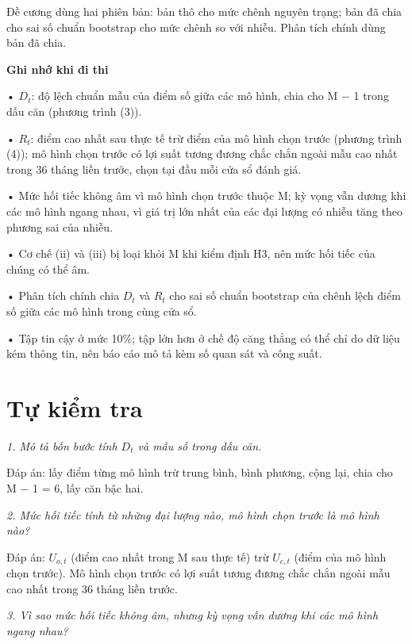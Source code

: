 Đề cương dùng hai phiên bản: bản thô cho mức chênh nguyên trạng; bản đã chia cho sai số chuẩn bootstrap cho mức chênh so với nhiễu. Phân tích chính dùng bản đã chia.

\begin{tcolorbox}[breakable]
\textbf{Ghi nhớ khi đi thi}

• \(D_{t}\): độ lệch chuẩn mẫu của điểm số giữa các mô hình, chia cho M − 1 trong dấu căn (phương trình (3)).

• \(R_{t}\): điểm cao nhất sau thực tế trừ điểm của mô hình chọn trước (phương trình (4)); mô hình chọn trước có lợi suất tương đương chắc chắn ngoài mẫu cao nhất trong 36 tháng liền trước, chọn tại đầu mỗi cửa sổ đánh giá.

• Mức hối tiếc không âm vì mô hình chọn trước thuộc M; kỳ vọng vẫn dương khi các mô hình ngang nhau, vì giá trị lớn nhất của các đại lượng có nhiễu tăng theo phương sai của nhiễu.

• Cơ chế (ii) và (iii) bị loại khỏi M khi kiểm định H3, nên mức hối tiếc của chúng có thể âm.

• Phân tích chính chia \(D_{t}\) và \(R_{t}\) cho sai số chuẩn bootstrap của chênh lệch điểm số giữa các mô hình trong cùng cửa sổ.

• Tập tin cậy ở mức 10\%; tập lớn hơn ở chế độ căng thẳng có thể chỉ do dữ liệu kém thông tin, nên báo cáo mô tả kèm số quan sát và công suất.
\end{tcolorbox}

\section{Tự kiểm tra}

{\itshape 1. Mô tả bốn bước tính \(D_{t}\) và mẫu số trong dấu căn.\par}

Đáp án: lấy điểm từng mô hình trừ trung bình, bình phương, cộng lại, chia cho M − 1 = 6, lấy căn bậc hai.

{\itshape 2. Mức hối tiếc tính từ những đại lượng nào, mô hình chọn trước là mô hình nào?\par}

Đáp án: \(U_{o,t}\) (điểm cao nhất trong M sau thực tế) trừ \(U_{c,t}\) (điểm của mô hình chọn trước). Mô hình chọn trước có lợi suất tương đương chắc chắn ngoài mẫu cao nhất trong 36 tháng liền trước.

{\itshape 3. Vì sao mức hối tiếc không âm, nhưng kỳ vọng vẫn dương khi các mô hình ngang nhau?\par}

